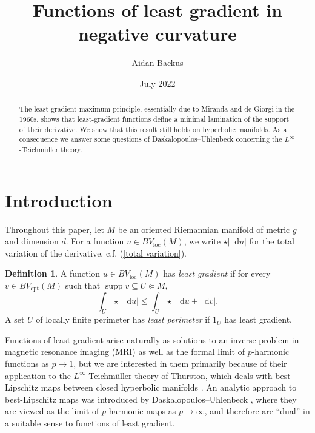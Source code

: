 \documentclass[reqno,10pt]{amsart}
\title{Functions of least gradient in negative curvature}
\author{Aidan Backus}
\date{July 2022}
\DeclareMathOperator{\supp}{supp}
\newcommand*\dif{\mathop{}\!\mathrm{d}}
\newcommand{\dfn}[1]{\emph{#1}\index{#1}}
\newcommand{\loc}{\mathrm{loc}}
\newcommand{\cpt}{\mathrm{cpt}}
\theoremstyle{definition}
\newtheorem{definition}[theorem]{Definition}
\numberwithin{equation}{section}
\begin{document}
\begin{abstract}
The least-gradient maximum principle, essentially due to Miranda and de Giorgi in the 1960s, shows that least-gradient functions define a minimal lamination of the support of their derivative.
We show that this result still holds on hyperbolic manifolds.
As a consequence we answer some questions of Daskalopoulos--Uhlenbeck concerning the $L^\infty$-Teichm\"uller theory.
\end{abstract}

\maketitle



\section{Introduction}
Throughout this paper, let $M$ be an oriented Riemannian manifold of metric $g$ and dimension $d$.
For a function $u \in BV_\loc(M)$, we write $\star |\dif u|$ for the total variation of the derivative, c.f. (\ref{total variation}).

\begin{definition}\label{main definitions}
A function $u \in BV_\loc(M)$ has \dfn{least gradient} if for every $v \in BV_\cpt(M)$ such that $\supp v \subseteq U \Subset M$,
$$\int_U \star |\dif u| \leq \int_U \star |\dif u + \dif v|.$$
A set $U$ of locally finite perimeter has \dfn{least perimeter} if $1_U$ has least gradient.
\end{definition}

Functions of least gradient arise naturally as solutions to an inverse problem in magnetic resonance imaging (MRI) \cite{Nachman2009, Tamasan2019, Joy09} as well as the formal limit of $p$-harmonic functions as $p \to 1$, but we are interested in them primarily because of their application to the $L^\infty$-Teichm\"uller theory of Thurston, which deals with best-Lipschitz maps between closed hyperbolic manifolds \cite{thurston1998minimal}.
An analytic approach to best-Lipschitz maps was introduced by Daskalopoulos--Uhlenbeck \cite{daskalopoulos2020transverse, daskalopoulosPrep1}, where they are viewed as the limit of $p$-harmonic maps as $p \to \infty$, and therefore are ``dual'' in a suitable sense to functions of least gradient.
\end{document}

